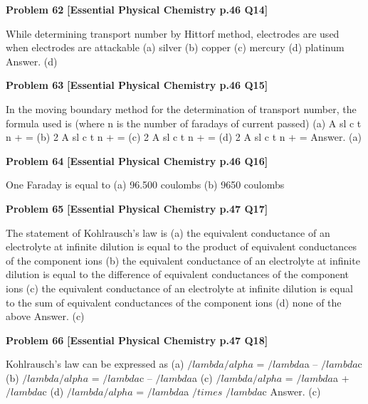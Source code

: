\begin{problembox}
\textbf{Problem 62} \hfill \textbf{[Essential Physical Chemistry p.46 Q14]}
\label{q:ext-essential_all_questions-62}

While determining transport number by Hittorf method, \underline{\hspace{1cm}} electrodes are used when electrodes
are attackable
(a)
silver
(b)
copper
(c)
mercury
(d)
platinum
Answer. (d)
\end{problembox}

\begin{problembox}
\textbf{Problem 63} \hfill \textbf{[Essential Physical Chemistry p.46 Q15]}
\label{q:ext-essential_all_questions-63}

In the moving boundary method for the determination of transport number, the formula used is (where
n is the number of faradays of current passed)
(a)
A
sl c
t
n
+ =
(b)
2
A
sl c
t
n
+ =
(c)
2
A
sl c
t
n
+ =
(d)
2
A
sl c
t
n
+ =
Answer. (a)
\end{problembox}

\begin{problembox}
\textbf{Problem 64} \hfill \textbf{[Essential Physical Chemistry p.46 Q16]}
\label{q:ext-essential_all_questions-64}

One Faraday is equal to
(a)
96.500 coulombs
(b)
9650 coulombs
\end{problembox}

\begin{problembox}
\textbf{Problem 65} \hfill \textbf{[Essential Physical Chemistry p.47 Q17]}
\label{q:ext-essential_all_questions-65}

The statement of Kohlrausch's law is
(a)
the equivalent conductance of an electrolyte at infinite dilution is equal to the product of equivalent
conductances of the component ions
(b)
the equivalent conductance of an electrolyte at infinite dilution is equal to the difference of
equivalent conductances of the component ions
(c)
the equivalent conductance of an electrolyte at infinite dilution is equal to the sum of equivalent
conductances of the component ions
(d)
none of the above
Answer. (c)
\end{problembox}

\begin{problembox}
\textbf{Problem 66} \hfill \textbf{[Essential Physical Chemistry p.47 Q18]}
\label{q:ext-essential_all_questions-66}

Kohlrausch's law can be expressed as
(a)
$/lambda$$/alpha$ = $/lambda$a -- $/lambda$c
(b)
$/lambda$$/alpha$ = $/lambda$c -- $/lambda$a
(c)
$/lambda$$/alpha$ = $/lambda$a + $/lambda$c
(d)
$/lambda$$/alpha$ = $/lambda$a $/times$ $/lambda$c
Answer. (c)
\end{problembox}

